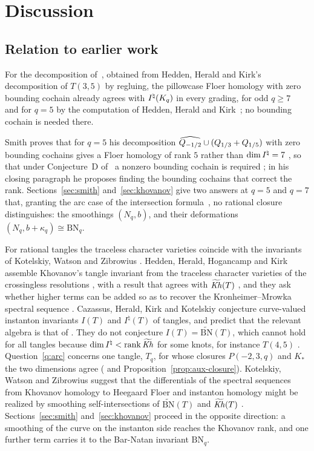 \section{Discussion}\label{sec:disc}

\subsection{Relation to earlier work}\label{ss:disc-prior}
For the decomposition of~\cite[\S4]{WuebbenII}, obtained from Hedden, Herald and Kirk's decomposition of $T(3,5)$
by regluing, the pillowcase Floer homology with zero bounding cochain already agrees with $I^{\natural}(K_q)$ in every
grading, for odd $q\ge7$~\cite[Thm.~1.2]{WuebbenII} and for $q=5$ by the computation of Hedden, Herald and
Kirk~\cite[\S11]{HHK2}; no bounding cochain is needed there.

Smith proves that for $q=5$ his decomposition $\widehat{Q_{-1/2}}\cup(Q_{1/3}+Q_{1/5})$ with zero bounding
cochains gives a Floer homology of rank $5$ rather than $\dim I^{\natural}=7$ \cite[proof of Thm.~5.9]{Smith}, so that
under Conjecture~D of~\cite{CHKK} a nonzero bounding cochain is required \cite[Thm.~5.9]{Smith};
in his closing paragraph he proposes finding the bounding cochains that correct the rank.  Sections~\ref{sec:smith} and~\ref{sec:khovanov} give
two answers at $q=5$ and $q=7$ that, granting the arc case of the intersection formula~\cite[Thm.~5.25]{KWZ},
no rational closure distinguishes: the smoothings $(N_q,b)$, and their deformations
$(N_q,b+\kappa_q)\cong\mathrm{BN}_q$.

For rational tangles the traceless character varieties coincide with the invariants of Kotelskiy,
Watson and Zibrowius \cite[\S1.8]{KWZ}.  Hedden, Herald, Hogancamp and Kirk assemble Khovanov's tangle invariant from the
traceless character varieties of the crossingless resolutions \cite[Thm.~1.1 and Cor.~1.2]{HHHK},
with a result that agrees with $\widetilde{\mathit{Kh}}(T)$ \cite{KWZagree}, and they ask whether higher terms
can be added so as to recover the Kronheimer--Mrowka spectral sequence \cite[Question~1.4]{HHHK}.
Cazassus, Herald, Kirk and Kotelskiy conjecture curve-valued instanton invariants $I(T)$ and
$I^\natural(T)$ of tangles, and predict that the relevant algebra is that of \cite{KWZ}
\cite[Conj.~E and \S11.4]{CHKK}.  They do not
conjecture $I(T)=\widetilde{\mathrm{BN}}(T)$, which cannot hold for all tangles because
$\dim I^{\natural}<\operatorname{rank}\widetilde{\mathit{Kh}}$ for some knots, for instance $T(4,5)$ \cite[\S\S10.2--10.3]{CHKK}.
Question~\ref{q:arc} concerns one tangle, $T_q$, for whose closures $P(-2,3,q)$ and $K_*$ the two
dimensions agree (\cite[\S3]{WuebbenII} and Proposition~\ref{prop:aux-closure}).  Kotelskiy, Watson
and Zibrowius suggest that the differentials of the spectral sequences from Khovanov homology to
Heegaard Floer and instanton homology might be realized by smoothing self-intersections of
$\widetilde{\mathrm{BN}}(T)$ and $\widetilde{\mathit{Kh}}(T)$ \cite[\S1.8]{KWZ}.  Sections~\ref{sec:smith}
and~\ref{sec:khovanov} proceed in the opposite direction: a smoothing of the curve on the instanton
side reaches the Khovanov rank, and one further term carries it to the Bar-Natan invariant $\mathrm{BN}_q$.

